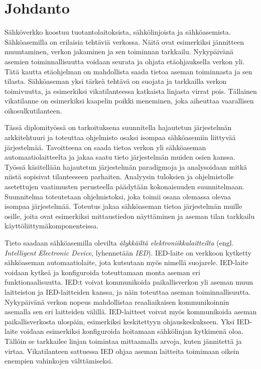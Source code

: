 \chapter{Johdanto}
\label{ch:johdanto}
Sähköverkko koostuu tuotantolaitoksista, sähkölinjoista ja sähköasemista. Sähköasemilla on erilaisia tehtäviä verkossa. Näitä ovat esimerkiksi jännitteen muuntaminen, verkon jakaminen ja sen toiminnan tarkkailu. Nykypäivänä asemien toiminnallisuutta voidaan seurata ja ohjata etäohjauksella verkon yli. Tätä kautta etäohjelman on mahdollista saada tietoa aseman toiminnasta ja sen tilasta. Sähköaseman yksi tärkeä tehtävä on suojata ja tarkkailla verkon toimivuutta, ja esimerkiksi vikatilanteessa katkaista linjasta virrat pois. Tällainen vikatilanne on esimerkiksi kaapelin poikki meneminen, joka aiheuttaa vaarallisen oikosulkutilanteen.

Tässä diplomityössä on tarkoituksena suunnitella hajautetun järjestelmän arkkitehtuuri ja toteuttaa ohjelmisto osaksi isompaa sähköasemiin liittyvää järjestelmää. Tavoitteena on saada tietoa verkon yli sähköaseman automaatiolaitteelta ja jakaa saatu tieto järjestelmän muiden osien kanssa. Työssä käsitellään hajautetun järjestelmän paradigmoja ja analysoidaan mitkä niistä sopisivat tilanteeseen parhaiten. Analyysin tuloksien ja ohjelmistolle asetettujen vaatimusten perusteella päädytään kokonaisuuden suunnitelmaan. Suunnitelma toteutetaan ohjelmistoksi, joka toimii osana olemassa olevaa isompaa järjestelmää. Toteutus jakaa sähköaseman tietoa järjestelmän muille osille, joita ovat esimerkiksi mittaustiedon näyttäminen ja aseman tilan tarkkailu käyttöliittymäkomponenteissa.

Tieto saadaan sähköasemilla olevilta \emph{älykkäiltä elektroniikkalaitteilta} (engl. \emph{Intelligent Electronic Device}, lyhennetään \emph{IED}). IED-laite on verkkoon kytketty sähköaseman automaatiolaite, jota kutsutaan myös nimellä suojarele. IED-laite voidaan kytkeä ja konfiguroida toteuttamaan monta aseman eri funktionaalisuutta. IED:t voivat kommunikoida paikallisverkon yli aseman muun laitteiston ja IED-laitteiden kanssa, ja näin toteuttaa aseman toiminnallisuutta. Nykypäivänä verkon nopeus mahdollistaa reaaliaikaisen kommunikoinnin asemalla sen eri laitteiden välillä. IED-laitteet voivat myös kommunikoida aseman paikallisverkosta ulospäin, esimerkiksi keskitettyyn ohjauskeskukseen. Yksi IED-laite voidaan esimerkiksi konfiguroida hoitamaan sähkölinjan kytkimenä oloa. Tällöin se tarkkailee linjan toimintaa mittaamalla arvoja, kuten jännitettä ja virtaa. Vikatilanteen sattuessa IED ohjaa aseman laitteita toimimaan oikein enempien vahinkojen välttämiseksi. \cite{Brunner2008}

